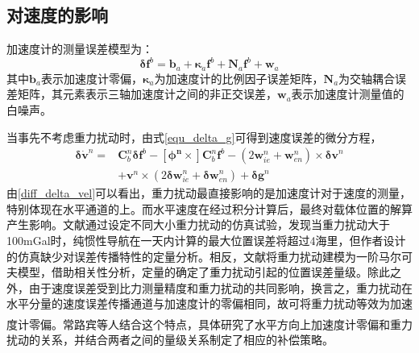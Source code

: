\documentclass[12pt,a4,utf8]{article}
\newcommand{\upcite}[1]{\textsuperscript{\textsuperscript{\cite{#1}}}} %
\begin{document}
\subsection{对速度的影响}
加速度计的测量误差模型为：
\begin{equation}
      \bm{\delta f}^b = \bm{b}_a + \bm{\kappa}_a \bm{f}^b + \bm{N}_a \bm{f}^b + \bm{w}_a
      \label{acc_bias}
\end{equation}
其中$\bm{b}_a$表示加速度计零偏，$\bm{\kappa}_a$为加速度计的比例因子误差矩阵，$\bm{N}_a$为交轴耦合误差矩阵，其元素表示三轴加速度计之间的非正交误差，$\bm{w}_a$表示加速度计测量值的白噪声。

当事先不考虑重力扰动时，由式\ref{equ_delta_g}可得到速度误差的微分方程，
\begin{equation}
      \begin{aligned}
      \bm{\delta \dot{v}}^n = &\bm{C}^n_b \bm{\delta f}^b - \bm{[\phi^n\times]}\bm{C}^n_b \bm{f}^b -(2\bm{w}^n_{ie} + \bm{w}^n_{en}) \times \bm{\delta v}^n \\
      &+ \bm{v}^n \times (2\bm{\delta w}^n_{ie} + \bm{\delta w}^n_{en}) + \bm{\delta g}^n
      \label{diff_delta_vel}
      \end{aligned}
\end{equation}
由\ref{diff_delta_vel}可以看出，重力扰动最直接影响的是加速度计对于速度的测量，特别体现在水平通道的上。而水平速度在经过积分计算后，最终对载体位置的解算产生影响。文献\cite{gao2021real}通过设定不同大小重力扰动的仿真试验，发现当重力扰动大于100mGal时，纯惯性导航在一天内计算的最大位置误差将超过4海里，但作者设计的仿真缺少对误差传播特性的定量分析。相反，文献\cite{WANGJING2016}将重力扰动建模为一阶马尔可夫模型，借助相关性分析，定量的确定了重力扰动引起的位置误差量级。除此之外，由于速度误差受到比力测量精度和重力扰动的共同影响，换言之，重力扰动在水平分量的速度误差传播通道与加速度计的零偏相同，故可将重力扰动等效为加速度计零偏。常路宾等人结合这个特点\upcite{chang2018gravity}，具体研究了水平方向上加速度计零偏和重力扰动的关系，并结合两者之间的量级关系制定了相应的补偿策略。
\end{document}
